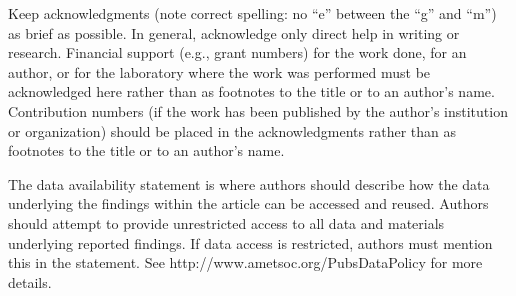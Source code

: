 \documentclass{ametsocV6.1}
\begin{document}
\clearpage
\acknowledgments
Keep acknowledgments (note correct spelling: no ``e'' between the ``g'' and
``m'') as brief as possible. In general, acknowledge only direct help in
writing or research. Financial support (e.g., grant numbers) for the work done,
for an author, or for the laboratory where the work was performed must be
acknowledged here rather than as footnotes to the title or to an author's name.
Contribution numbers (if the work has been published by the author's institution
or organization) should be placed in the acknowledgments rather than as
footnotes to the title or to an author's name.

%
%
\datastatement
The data availability statement is where authors should describe how the data underlying
the findings within the article can be accessed and reused. Authors should attempt to
provide unrestricted access to all data and materials underlying reported findings.
If data access is restricted, authors must mention this in the statement.
See http://www.ametsoc.org/PubsDataPolicy for more details.









%
\end{document}
